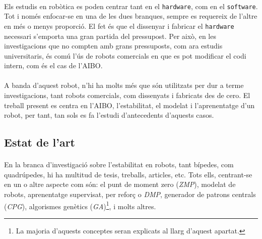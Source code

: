 \documentclass[12pt,a4paper,final,twoside]{article}
\begin{document}
\paragraph{}Els estudis en robòtica es poden centrar tant en el \texttt{hardware}, com en el \texttt{software}. Tot i només enfocar-se en una de les dues branques, sempre es requereix de l'altre en més o menys proporció. El fet és que el dissenyar i fabricar el \texttt{hardware} necessari s'emporta una gran partida del pressupost. Per això, en les investigacions que no compten amb grans pressuposts, com ara estudis universitaris, és comú l'ús de robots comercials en que es pot modificar el codi intern, com és el cas de l'AIBO.

\paragraph{}A banda d'aquest robot, n'hi ha molts més que són utilitzats per dur a terme investigacions, tant robots comercials, com dissenyats i fabricats des de cero. El treball present es centra en l'AIBO, l'estabilitat, el modelat i l'aprenentatge d'un robot, per tant, tan sols es fa l'estudi d'antecedents d'aquests casos.

\label{Estat-de-l'art}
\subsection*{Estat de l'art}



\paragraph{}En la branca d'investigació sobre l'estabilitat en robots, tant bípedes, com quadrúpedes, hi ha multitud de tesis, treballs, articles, etc. Tots ells, centrant-se en un o altre aspecte com són: el punt de moment zero (\textit{ZMP}), modelat de robots, aprenentatge supervisat, per reforç o \textit{DMP}, generador de patrons centrals (\textit{CPG}), algorismes genètics (\textit{GA})\footnote{La majoria d'aquests conceptes seran explicats al llarg d'aquest apartat.}, i molts altres.
\end{document}
